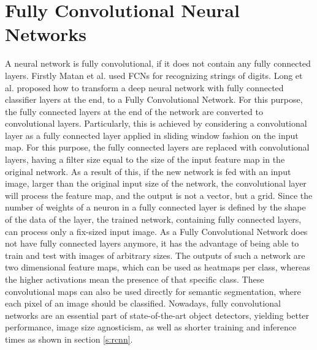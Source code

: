 \section{Fully Convolutional Neural Networks}\label{s:fullyconvnet}
A neural network is fully convolutional, if it does not contain any fully connected layers. Firstly Matan et al. \cite{Matan92multi-digitrecognition} used FCNs for recognizing strings of digits. Long et al. \cite{DBLP:journals/corr/LongSD14} proposed how to transform a deep neural network with fully connected classifier layers at the end, to a Fully Convolutional Network. For this purpose, the fully connected layers at the end of the network are converted to convolutional layers. Particularly, this is achieved by considering a convolutional layer as a fully connected layer applied in sliding window fashion on the input map. For this purpose, the fully connected layers are replaced with convolutional layers, having a filter size equal to the size of the input feature map in the original network. As a result of this, if the new network is fed with an input image, larger than the original input size of the network, the convolutional layer will process the feature map, and the output is not a vector, but a grid.
\bigbreak
Since the number of weights of a neuron in a fully connected layer is defined by the shape of the data of the layer, the trained network, containing fully connected layers, can process only a fix-sized input image. As a Fully Convolutional Network does not have fully connected layers anymore, it has the advantage of being able to train and test with images of arbitrary sizes.
\bigbreak
The outputs of such a network are two dimensional feature maps, which can be used as heatmaps per class, whereas the higher activations mean the presence of that specific class. These convolutional maps can also be used directly for semantic segmentation, where each pixel of an image should be classified.
Nowadays, fully convolutional networks are an essential part of state-of-the-art object detectors, yielding better performance, image size agnosticism, as well as shorter training and inference times as shown in section \ref{s:rcnn}.
\bigbreak
